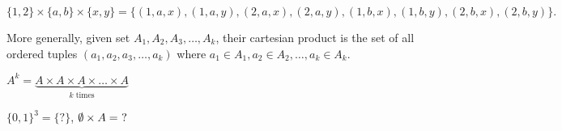 \begin{eg}
	\[ \{1,2\} \times \{a,b\} \times \{x,y\} = \{ (1, a, x), (1, a, y), (2, a, x), (2, a, y), (1, b, x), (1, b, y), (2, b, x), (2, b, y) \} .\]
\end{eg}

More generally, given set \( A_{1}, A_{2}, A_{3}, \ldots, A_k \), their cartesian product is the set of all ordered tuples \( (a_{1}, a_{2}, a_{3}, \ldots , a_k) \) where \( a_{1} \in A_1, a_{2} \in A_2, \ldots , a_k \in A_k \).

\begin{notation}
	\( A^k = \underbrace{A \times A \times  A \times \ldots \times A}_{k \text{ times}}\)
\end{notation}

\( \{0,1\}^3 = \{?\}   \), \( \emptyset \times A = ~?\)
